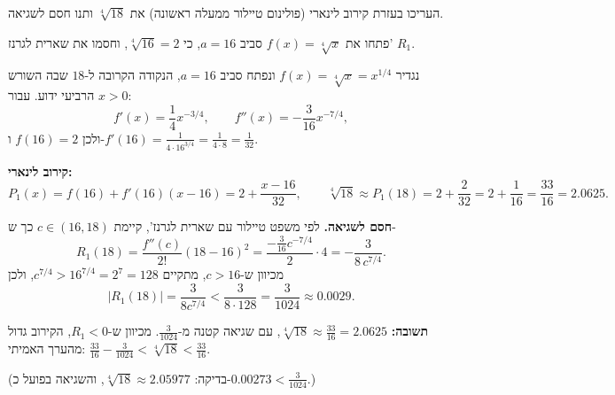 
\begin{question}
העריכו בעזרת קירוב לינארי (פולינום טיילור ממעלה ראשונה) את $\sqrt[4]{18}$ ותנו חסם לשגיאה.
\end{question}

\begin{hint}
פתחו את $f(x) = \sqrt[4]{x}$ סביב $a = 16$, כי $\sqrt[4]{16} = 2$, וחסמו את שארית לגרנז' $R_1$.
\end{hint}

\begin{solution}
נגדיר $f(x) = \sqrt[4]{x} = x^{1/4}$ ונפתח סביב $a = 16$, הנקודה הקרובה ל-$18$ שבה השורש הרביעי ידוע. עבור $x > 0$:
\[ f'(x) = \frac14 x^{-3/4}, \qquad f''(x) = -\frac{3}{16} x^{-7/4}, \]
ולכן $f(16) = 2$ ו-$f'(16) = \frac{1}{4\cdot 16^{3/4}} = \frac{1}{4\cdot 8} = \frac{1}{32}$.

\textbf{קירוב לינארי:}
\[ P_1(x) = f(16) + f'(16)(x - 16) = 2 + \frac{x - 16}{32}, \qquad
   \sqrt[4]{18} \approx P_1(18) = 2 + \frac{2}{32} = 2 + \frac{1}{16} = \frac{33}{16} = 2.0625. \]

\textbf{חסם לשגיאה.} לפי משפט טיילור עם שארית לגרנז', קיימת $c \in (16, 18)$ כך ש-
\[ R_1(18) = \frac{f''(c)}{2!}(18 - 16)^2 = \frac{-\frac{3}{16}c^{-7/4}}{2}\cdot 4 = -\frac{3}{8\,c^{7/4}}. \]
מכיוון ש-$c > 16$, מתקיים $c^{7/4} > 16^{7/4} = 2^7 = 128$, ולכן
\[ |R_1(18)| = \frac{3}{8c^{7/4}} < \frac{3}{8\cdot128} = \frac{3}{1024} \approx 0.0029. \]

\textbf{תשובה:} $\sqrt[4]{18} \approx \frac{33}{16} = 2.0625$, עם שגיאה קטנה מ-$\frac{3}{1024}$. מכיוון ש-$R_1 < 0$, הקירוב גדול מהערך האמיתי: $\frac{33}{16} - \frac{3}{1024} < \sqrt[4]{18} < \frac{33}{16}$.

(בדיקה: $\sqrt[4]{18} \approx 2.05977$, והשגיאה בפועל כ-$0.00273 < \frac{3}{1024}$.)
\end{solution}
